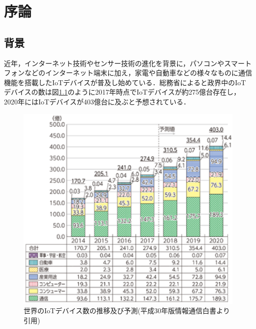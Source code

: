 \chapter{序論} %


\section{背景} %


近年，インターネット技術やセンサー技術の進化を背景に，パソコンやスマートフォンなどのインターネット端末に加え，家電や自動車などの様々なものに通信機能を搭載したIoTデバイスが普及し始めている．総務省によると政界中のIoTデバイスの数は図\ref{fig:IoT}のように2017年時点でIoTデバイスが約275億台存在し，2020年にはIoTデバイスが403億台に及ぶと予想されている\cite{IoT}．
 \begin{figure}[hb]
 \centering
    \includegraphics{figures/IoT_device.eps}
    \caption{世界のIoTデバイス数の推移及び予測(平成30年版情報通信白書\cite{IoT}より引用)}
 \label{fig:IoT}
 \end{figure}
 \clearpage

